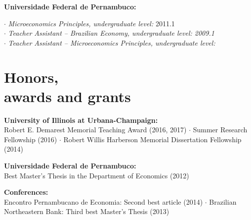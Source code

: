 \documentclass[mm, 10pt]{simple_style}
\begin{document}
\begin{resume}
\textbf{Universidade Federal de Pernambuco:}

$\cdot$ \textit{Microeconomics Principles, undergraduate level:} 2011.1\\
$\cdot$ \textit{Teacher Assistant -- Brazilian Economy, undergraduate level: 2009.1}\\
$\cdot$ \textit{Teacher Assistant -- Microeconomics Principles, undergraduate level:}

\section{Honors,\\ awards and grants}

\textbf{University of Illinois at Urbana-Champaign:} \\
Robert E. Demarest Memorial Teaching Award (2016, 2017) 
$\cdot$ Summer Research Fellowship (2016)
$\cdot$ Robert Willis Harberson Memorial Dissertation Fellowship (2014)

\textbf{Universidade Federal de Pernambuco:} \\
Best Master’s Thesis in the Department of Economics (2012)

\textbf{Conferences:}\\
Encontro Pernambucano de Economia: Second best article (2014)
$\cdot$ Brazilian Northeastern Bank: Third best Master’s Thesis (2013)





\end{resume}
\end{document}
